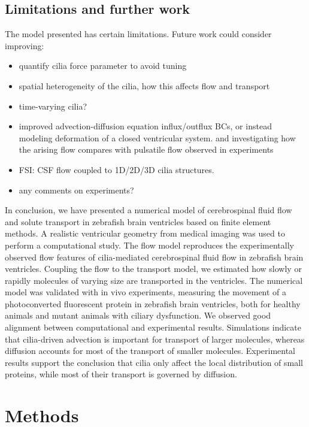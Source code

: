 \documentclass{WileyMSP-template}
\begin{document}
\subsection{Limitations and further work}
The model presented has certain limitations. Future work could consider improving:
\begin{itemize}
    \item quantify cilia force parameter to avoid tuning
    \item spatial heterogeneity of the cilia, how this affects flow and transport
    \item time-varying cilia?
    \item improved advection-diffusion equation influx/outflux BCs, or instead
    modeling deformation of a closed ventricular system. 
    and investigating how the arising flow compares with pulsatile flow observed in experiments
    \item FSI: CSF flow coupled to 1D/2D/3D cilia structures.
    \item any comments on experiments?
\end{itemize}

In conclusion, we have presented a numerical model
of cerebrospinal fluid flow and solute transport in
zebrafish brain ventricles based on finite element methods.
A realistic ventricular geometry from medical imaging was used to perform a
computational study. The flow model reproduces
the experimentally observed flow features of cilia-mediated cerebrospinal fluid
flow in zebrafish brain ventricles. Coupling the flow to the transport model,
we estimated how slowly or rapidly molecules of varying size are transported in
the ventricles. 
The numerical model was validated with in vivo experiments, measuring the movement of
a photoconverted fluorescent protein in zebrafish brain ventricles,
both for healthy animals and mutant animals with ciliary dysfunction.
We observed good alignment between computational and experimental results.
Simulations indicate that cilia-driven advection is important
for transport of larger molecules, whereas diffusion accounts for most of
the transport of smaller molecules. 
Experimental results support the conclusion that cilia only affect the
local distribution of small proteins,
while most of their transport is governed by diffusion. 

\section{Methods}
\end{document}
